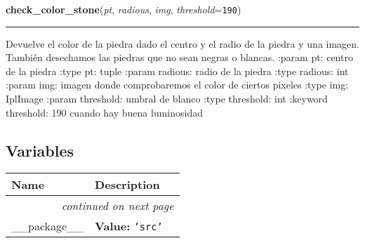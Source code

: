    \label{src:search_stones:check_color_stone}

    \vspace{0.5ex}

\hspace{.8\funcindent}\begin{boxedminipage}{\funcwidth}

    \raggedright \textbf{check\_color\_stone}(\textit{pt}, \textit{radious}, \textit{img}, \textit{threshold}={\tt 190})

    \vspace{-1.5ex}

    \rule{\textwidth}{0.5\fboxrule}
\setlength{\parskip}{2ex}
    Devuelve el color de la piedra dado el centro y el radio de la piedra y
    una imagen. También desechamos las piedras que no sean negras o 
    blancas. :param pt: centro de la piedra :type pt: tuple :param radious:
    radio de la piedra :type radious: int :param img: imagen donde 
    comprobaremos el color de ciertos pixeles :type img: IplImage :param 
    threshold: umbral de blanco :type threshold: int :keyword threshold: 
    190 cuando hay buena luminosidad

\setlength{\parskip}{1ex}
    \end{boxedminipage}



  \subsection{Variables}

    \vspace{-1cm}
\hspace{\varindent}\begin{longtable}{|p{\varnamewidth}|p{\vardescrwidth}|l}
\cline{1-2}
\cline{1-2} \centering \textbf{Name} & \centering \textbf{Description}& \\
\cline{1-2}
\endhead\cline{1-2}\multicolumn{3}{r}{\small\textit{continued on next page}}\\\endfoot\cline{1-2}
\endlastfoot\raggedright \_\-\_\-p\-a\-c\-k\-a\-g\-e\-\_\-\_\- & \raggedright \textbf{Value:} 
{\tt \texttt{'}\texttt{src}\texttt{'}}&\\
\cline{1-2}
\end{longtable}

